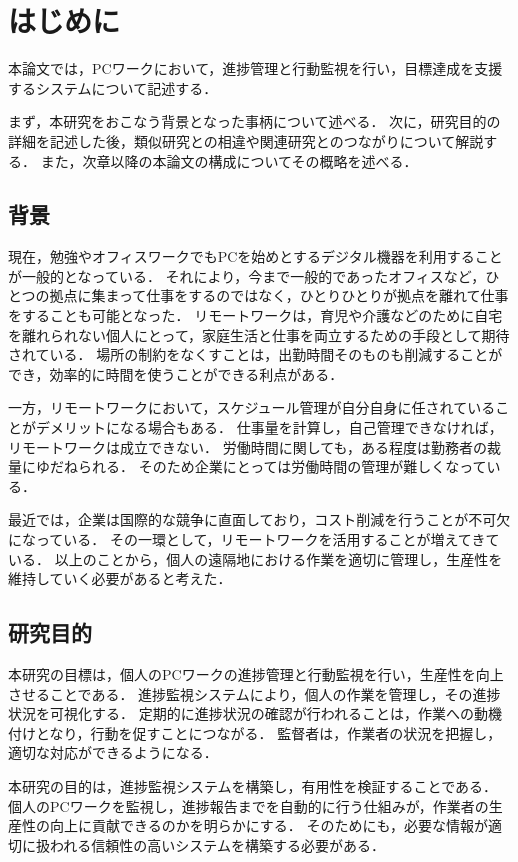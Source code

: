 \chapter{はじめに}
本論文では，PCワークにおいて，進捗管理と行動監視を行い，目標達成を支援するシステムについて記述する．

まず，本研究をおこなう背景となった事柄について述べる．
次に，研究目的の詳細を記述した後，類似研究との相違や関連研究とのつながりについて解説する．
また，次章以降の本論文の構成についてその概略を述べる．

\section{背景}
現在，勉強やオフィスワークでもPCを始めとするデジタル機器を利用することが一般的となっている．
それにより，今まで一般的であったオフィスなど，ひとつの拠点に集まって仕事をするのではなく，ひとりひとりが拠点を離れて仕事をすることも可能となった．
リモートワークは，育児や介護などのために自宅を離れられない個人にとって，家庭生活と仕事を両立するための手段として期待されている．
場所の制約をなくすことは，出勤時間そのものも削減することができ，効率的に時間を使うことができる利点がある\cite{tele2017}．

一方，リモートワークにおいて，スケジュール管理が自分自身に任されていることがデメリットになる場合もある．
仕事量を計算し，自己管理できなければ，リモートワークは成立できない．
労働時間に関しても，ある程度は勤務者の裁量にゆだねられる．
そのため企業にとっては労働時間の管理が難しくなっている\cite{Adachi2010}．

最近では，企業は国際的な競争に直面しており，コスト削減を行うことが不可欠になっている．
その一環として，リモートワークを活用することが増えてきている\cite{Telework2010}．
以上のことから，個人の遠隔地における作業を適切に管理し，生産性を維持していく必要があると考えた．

\section{研究目的}
本研究の目標は，個人のPCワークの進捗管理と行動監視を行い，生産性を向上させることである．
進捗監視システムにより，個人の作業を管理し，その進捗状況を可視化する．
定期的に進捗状況の確認が行われることは，作業への動機付けとなり，行動を促すことにつながる．
監督者は，作業者の状況を把握し，適切な対応ができるようになる．

本研究の目的は，進捗監視システムを構築し，有用性を検証することである．
個人のPCワークを監視し，進捗報告までを自動的に行う仕組みが，作業者の生産性の向上に貢献できるのかを明らかにする．
そのためにも，必要な情報が適切に扱われる信頼性の高いシステムを構築する必要がある．

